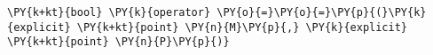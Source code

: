 \begin{Verbatim}[commandchars=\\\{\}]
    \PY{k+kt}{bool} \PY{k}{operator} \PY{o}{=}\PY{o}{=}\PY{p}{(}\PY{k}{explicit} \PY{k+kt}{point} \PY{n}{M}\PY{p}{,} \PY{k}{explicit} \PY{k+kt}{point} \PY{n}{P}\PY{p}{)}
\end{Verbatim}
